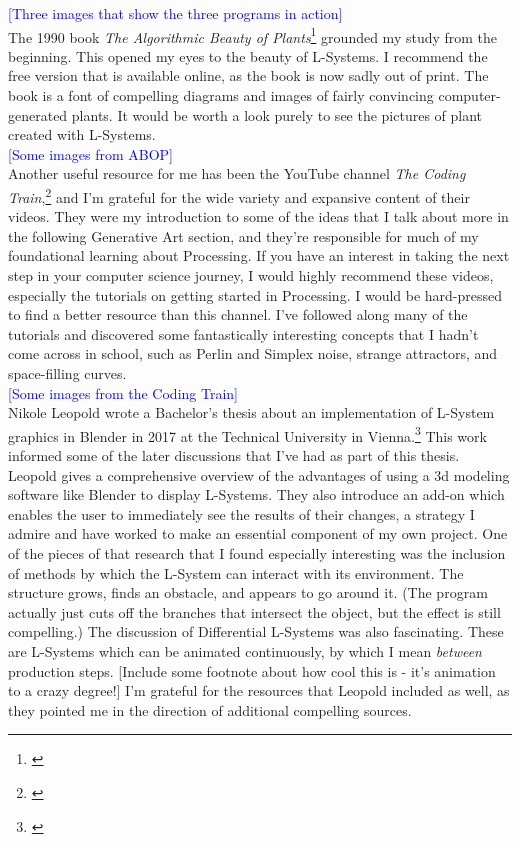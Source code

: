 \documentclass[12pt,twoside]{reedthesis}
\begin{document}
	\textcolor{blue}{[Three images that show the three programs in action]}\\

	The 1990 book \textit{The Algorithmic Beauty of Plants}\footnote{\cite{ABOP1990}} grounded my study from the beginning. This opened my eyes to the beauty of L-Systems. I recommend the free version that is available online, as the book is now sadly out of print. The book is a font of compelling diagrams and images of fairly convincing computer-generated plants. It would be worth a look purely to see the pictures of plant created with L-Systems.\\
	
	\textcolor{blue}{[Some images from ABOP]}\\
	
	Another useful resource for me has been the YouTube channel \textit{The Coding Train},\footnote{\cite{codingTrain}} and I'm grateful for the wide variety and expansive content of their videos. They were my introduction to some of the ideas that I talk about more in the following Generative Art section, and they're responsible for much of my foundational learning about Processing. If you have an interest in taking the next step in your computer science journey, I would highly recommend these videos, especially the tutorials on getting started in Processing. I would be hard-pressed to find a better resource than this channel. I've followed along many of the tutorials and discovered some fantastically interesting concepts that I hadn't come across in school, such as Perlin and Simplex noise, strange attractors, and space-filling curves.\\
	
	\textcolor{blue}{[Some images from the Coding Train]}\\
	
	Nikole Leopold wrote a Bachelor's thesis about an implementation of L-System graphics in Blender in 2017 at the Technical University in Vienna.\footnote{\cite{Leopold2017}} This work informed some of the later discussions that I've had as part of this thesis. Leopold gives a comprehensive overview of the advantages of using a 3d modeling software like Blender to display L-Systems. They also introduce an add-on which enables the user to immediately see the results of their changes, a strategy I admire and have worked to make an essential component of my own project. One of the pieces of that research that I found especially interesting was the inclusion of methods by which the L-System can interact with its environment. The structure grows, finds an obstacle, and appears to go around it. (The program actually just cuts off the branches that intersect the object, but the effect is still compelling.) The discussion of Differential L-Systems was also fascinating. These are L-Systems which can be animated continuously, by which I mean \textit{between} production steps. [Include some footnote about how cool this is - it's animation to a crazy degree!] I'm grateful for the resources that Leopold included as well, as they pointed me in the direction of additional compelling sources.\\
	
\end{document}
